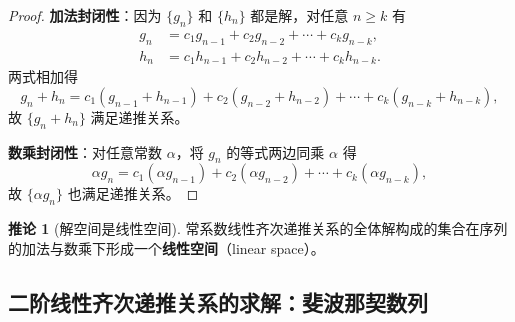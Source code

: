 \documentclass[UTF8,11pt,a4paper]{ctexbook}   %
\theoremstyle{definition}
\newtheorem{corollary}{推论}[section]
\begin{document}
\begin{proof}
\textbf{加法封闭性}：因为 $\{g_n\}$ 和 $\{h_n\}$ 都是解，对任意 $n \ge k$ 有
\begin{align*}
g_n &= c_1 g_{n-1} + c_2 g_{n-2} + \cdots + c_k g_{n-k},\\
h_n &= c_1 h_{n-1} + c_2 h_{n-2} + \cdots + c_k h_{n-k}.
\end{align*}
两式相加得
\[
g_n + h_n = c_1(g_{n-1}+h_{n-1}) + c_2(g_{n-2}+h_{n-2}) + \cdots + c_k(g_{n-k}+h_{n-k}),
\]
故 $\{g_n+h_n\}$ 满足递推关系。

\textbf{数乘封闭性}：对任意常数 $\alpha$，将 $g_n$ 的等式两边同乘 $\alpha$ 得
\[
\alpha g_n = c_1(\alpha g_{n-1}) + c_2(\alpha g_{n-2}) + \cdots + c_k(\alpha g_{n-k}),
\]
故 $\{\alpha g_n\}$ 也满足递推关系。
\end{proof}

\begin{corollary}[解空间是线性空间]
常系数线性齐次递推关系的全体解构成的集合在序列的加法与数乘下形成一个\textbf{线性空间}（linear space）。
\end{corollary}

\subsection{二阶线性齐次递推关系的求解：斐波那契数列}
\end{document}
